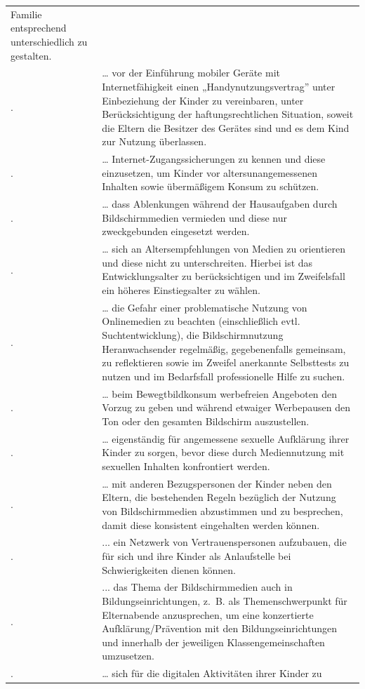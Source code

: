 \documentclass[
  letterpaper,
  DIV=11]{scrartcl}
\begin{document}
\begin{longtable}[]{@{}
  >{\raggedright\arraybackslash}p{}
  >{\raggedright\arraybackslash}p{}@{}}
Familie entsprechend unterschiedlich zu gestalten. \\
12. & \ldots{} vor der Einführung mobiler Geräte mit Internetfähigkeit
einen „Handynutzungsvertrag'' unter Einbeziehung der Kinder zu
vereinbaren, unter Berücksichtigung der haftungsrechtlichen Situation,
soweit die Eltern die Besitzer des Gerätes sind und es dem Kind zur
Nutzung überlassen. \\
13. & \ldots{} Internet-Zugangssicherungen zu kennen und diese
einzusetzen, um Kinder vor altersunangemessenen Inhalten sowie
übermäßigem Konsum zu schützen. \\
14. & \ldots{} dass Ablenkungen während der Hausaufgaben durch
Bildschirmmedien vermieden und diese nur zweckgebunden eingesetzt
werden. \\
15. & \ldots{} sich an Altersempfehlungen von Medien zu orientieren und
diese nicht zu unterschreiten. Hierbei ist das Entwicklungsalter zu
berücksichtigen und im Zweifelsfall ein höheres Einstiegsalter zu
wählen. \\
16. & \ldots{} die Gefahr einer problematische Nutzung von Onlinemedien
zu beachten (einschließlich evtl. Suchtentwicklung), die
Bildschirmnutzung Heranwachsender regelmäßig, gegebenenfalls gemeinsam,
zu reflektieren sowie im Zweifel anerkannte Selbsttests zu nutzen und im
Bedarfsfall professionelle Hilfe zu suchen. \\
17. & \ldots{} beim Bewegtbildkonsum werbefreien Angeboten den Vorzug zu
geben und während etwaiger Werbepausen den Ton oder den gesamten
Bildschirm auszustellen. \\
18. & \ldots{} eigenständig für angemessene sexuelle Aufklärung ihrer
Kinder zu sorgen, bevor diese durch Mediennutzung mit sexuellen Inhalten
konfrontiert werden. \\
19. & \ldots{} mit anderen Bezugspersonen der Kinder neben den Eltern,
die bestehenden Regeln bezüglich der Nutzung von Bildschirmmedien
abzustimmen und zu besprechen, damit diese konsistent eingehalten werden
können. \\
20. & ... ein Netzwerk von Vertrauenspersonen aufzubauen, die für sich
und ihre Kinder als Anlaufstelle bei Schwierigkeiten dienen können. \\
21. & ... das Thema der Bildschirmmedien auch in Bildungseinrichtungen,
z.~B. als Themenschwerpunkt für Elternabende anzusprechen, um eine
konzertierte Aufklärung/Prävention mit den Bildungseinrichtungen und
innerhalb der jeweiligen Klassengemeinschaften umzusetzen. \\
22. & \ldots{} sich für die digitalen Aktivitäten ihrer Kinder zu

\end{longtable}
\end{document}
